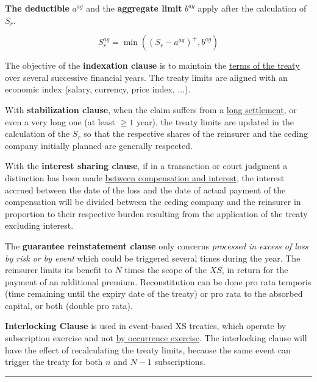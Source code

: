 \begin{f}

\textbf{The deductible} \(a^{ag}\) and the \textbf{aggregate limit} \(b^{ag}\) apply after the calculation of \(S_r\).

\[
S_r^{ag} = \min\left( \left(S_r - a^{ag}  \right)^+,b^{ag}\right)  
\]
\medskip

The objective of the \textbf{indexation clause} is to maintain the \underline{terms of the treaty} over several successive financial years. The treaty limits are aligned with an economic index (salary, currency, price index, ...).
\medskip

With \textbf{stabilization clause}, when the claim suffers from a \underline{long settlement}, or even a very long one (at least \(\geq 1\) year), the treaty limits are updated in the calculation of the \(S_r\) so that the respective shares of the reinsurer and the ceding company initially planned are generally respected.
\medskip
	

With the \textbf{interest sharing clause}, if in a transaction or court judgment a distinction has been made \underline{between compensation and interest}, the interest accrued between the date of the loss and the date of actual payment of the compensation will be divided between the ceding company and the reinsurer in proportion to their respective burden resulting from the application of the treaty excluding interest.


\medskip


The \textbf{guarantee reinstatement clause}
only concerns \emph{processed in excess of loss by risk or by event} which could be triggered several times during the year.
The reinsurer limits its benefit to \(N\) times the scope of the \(XS\), in return for the payment of an additional premium.
Reconstitution can be done pro rata temporis (time remaining until the expiry date of the treaty) or pro rata to the absorbed capital, or both (double pro rata).




\textbf{Interlocking Clause} is used in event-based XS treaties, which operate by subscription exercise and not \underline{by occurrence exercise}.
The interlocking clause will have the effect of recalculating the treaty limits, because the same event can trigger the treaty for both \(n\) and \(N-1\) subscriptions.


\end{f}
\hrule

